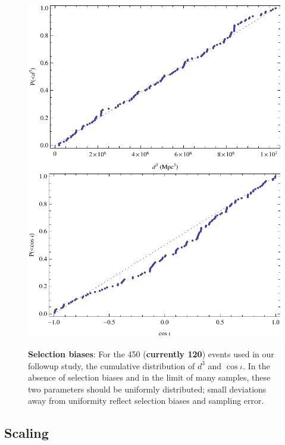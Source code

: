\documentclass[twocolumn,prd,nofootinbib]{revtex4}
\begin{document}
\begin{figure}
\includegraphics[width=\columnwidth]{../Figures/fig-mma-manual-2015MDC-SelectedEvents-DistanceCumulative}
\includegraphics[width=\columnwidth]{../Figures/fig-mma-manual-2015MDC-SelectedEvents-CosIotaCumulative}
\caption{\label{fig:SearchSelection}\textbf{Selection biases}: For the 450 (\textbf{currently 120}) events used in our followup study, the cumulative distribution of $d^3$
  and $\cos \iota$.  In the absence of selection biases and in the limit of many samples, these two parameters should be
  uniformly distributed; small deviations away from uniformity reflect selection biases and sampling error.
}
\end{figure}


\subsection{Scaling}
\end{document}
